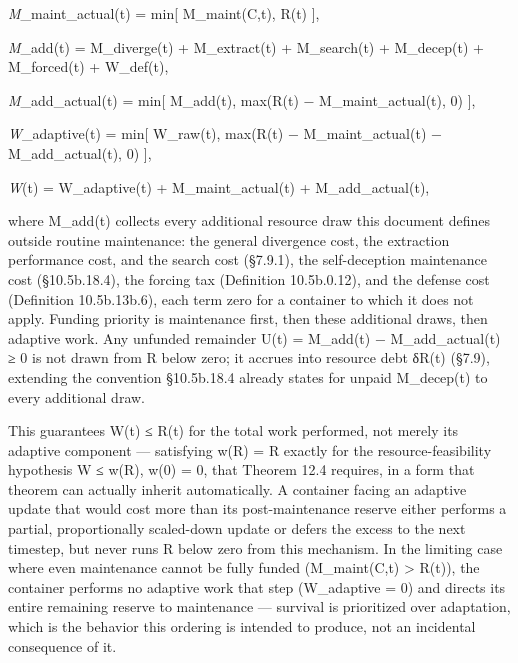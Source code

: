 \documentclass[
]{article}
\begin{document}
\emph{M}\_maint\_actual(t) = min{[} M\_maint(C,t), R(t) {]},

\emph{M}\_add(t) = M\_diverge(t) + M\_extract(t) + M\_search(t) +
M\_decep(t) + M\_forced(t) + W\_def(t),

\emph{M}\_add\_actual(t) = min{[} M\_add(t), max(R(t) −
M\_maint\_actual(t), 0) {]},

\emph{W}\_adaptive(t) = min{[} W\_raw(t), max(R(t) − M\_maint\_actual(t)
− M\_add\_actual(t), 0) {]},

\emph{W}(t) = W\_adaptive(t) + M\_maint\_actual(t) + M\_add\_actual(t),

where M\_add(t) collects every additional resource draw this document
defines outside routine maintenance: the general divergence cost, the
extraction performance cost, and the search cost (§7.9.1), the
self-deception maintenance cost (§10.5b.18.4), the forcing tax
(Definition 10.5b.0.12), and the defense cost (Definition 10.5b.13b.6),
each term zero for a container to which it does not apply. Funding
priority is maintenance first, then these additional draws, then
adaptive work. Any unfunded remainder U(t) = M\_add(t) −
M\_add\_actual(t) ≥ 0 is not drawn from R below zero; it accrues into
resource debt δR(t) (§7.9), extending the convention §10.5b.18.4 already
states for unpaid M\_decep(t) to every additional draw.

This guarantees W(t) ≤ R(t) for the total work performed, not merely its
adaptive component --- satisfying w(R) = R exactly for the
resource-feasibility hypothesis W ≤ w(R), w(0) = 0, that Theorem 12.4
requires, in a form that theorem can actually inherit automatically. A
container facing an adaptive update that would cost more than its
post-maintenance reserve either performs a partial, proportionally
scaled-down update or defers the excess to the next timestep, but never
runs R below zero from this mechanism. In the limiting case where even
maintenance cannot be fully funded (M\_maint(C,t) \textgreater{} R(t)),
the container performs no adaptive work that step (W\_adaptive = 0) and
directs its entire remaining reserve to maintenance --- survival is
prioritized over adaptation, which is the behavior this ordering is
intended to produce, not an incidental consequence of it.
\end{document}
